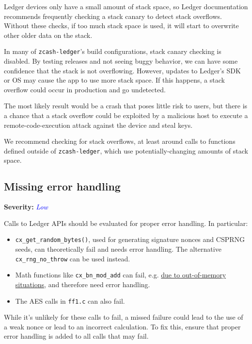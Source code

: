 \documentclass[10pt,titlepage]{article}
\newcommand{\LowIssue}{\textcolor{blue}{\emph{Low}}}
\begin{document}
Ledger devices only have a small amount of stack space, so Ledger documentation
recommends frequently checking a stack canary to detect stack overflows. Without
these checks, if too much stack space is used, it will start to overwrite other
older data on the stack.

In many of \texttt{zcash-ledger}'s build configurations, stack canary checking
is disabled. By testing releases and not seeing buggy behavior, we can have some
confidence that the stack is not overflowing. However, updates to Ledger's SDK
or OS may cause the app to use more stack space. If this happens, a stack
overflow could occur in production and go undetected.

The most likely result would be a crash that poses little risk to users, but
there is a chance that a stack overflow could be exploited by a malicious host
to execute a remote-code-execution attack against the device and steal keys.

We recommend checking for stack overflows, at least around calls to functions
defined outside of \texttt{zcash-ledger}, which use potentially-changing amounts
of stack space.

\subsection{Missing error handling} \label{issueerrorhandling}
\textbf{Severity:} \LowIssue

Calls to Ledger APIs should be evaluated for proper error handling. In
particular:

\begin{itemize}
      \item \texttt{cx\_get\_random\_bytes()}, used for generating signature
      nonces and CSPRNG seeds, can theoretically fail and needs error handling.
      The alternative \texttt{cx\_rng\_no\_throw} can be used instead.
      \item Math functions like \texttt{cx\_bn\_mod\_add} can fail, e.g.
      \href{https://developers.ledger.com/docs/embedded-app/crypto-api/ox__bn_8h/#a5be0853e346986506d1320184d9563f4}{due
      to out-of-memory situations}, and therefore need error handling.
      \item The AES calls in \texttt{ff1.c} can also fail.
\end{itemize}

While it's unlikely for these calls to fail, a missed failure could lead to the
use of a weak nonce or lead to an incorrect calculation. To fix this, ensure
that proper error handling is added to all calls that may fail.
\end{document}
